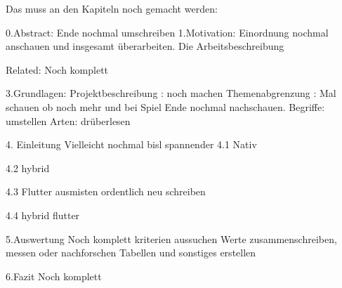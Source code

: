 Das muss an den Kapiteln noch gemacht werden:

0.Abstract:
Ende nochmal umschreiben
1.Motivation:
Einordnung nochmal anschauen und insgesamt überarbeiten.
Die Arbeitsbeschreibung

Related:
Noch komplett

3.Grundlagen:
Projektbeschreibung : 
noch machen
Themenabgrenzung :
Mal schauen ob noch mehr und bei Spiel Ende nochmal nachschauen.
Begriffe:
umstellen
Arten:
drüberlesen

4. Einleitung
Vielleicht nochmal bisl spannender
4.1 Nativ

4.2 hybrid

4.3 Flutter
ausmisten
ordentlich neu schreiben

4.4 hybrid flutter

5.Auswertung
Noch komplett
kriterien aussuchen
Werte zusammenschreiben, messen oder nachforschen
Tabellen und sonstiges erstellen

6.Fazit
Noch komplett
